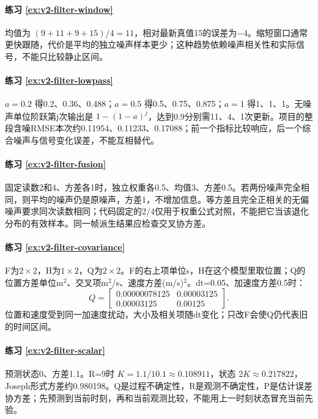 \paragraph*{练习 \ref{ex:v2-filter-window}}
\begin{solution}
均值为 $(9+11+9+15)/4=11$，相对最新真值15的误差为$-4$。缩短窗口通常更快跟随，代价是平均的独立噪声样本更少；这种趋势依赖噪声相关性和实际信号，不能只比较静止区间。
\end{solution}

\paragraph*{练习 \ref{ex:v2-filter-lowpass}}
\begin{solution}
$a=0.2$ 得0.2、0.36、0.488；$a=0.5$ 得0.5、0.75、0.875；$a=1$ 得1、1、1。无噪声单位阶跃第j次输出是 $1-(1-a)^j$，达到0.9分别需11、4、1次更新。项目的整段含噪RMSE本次约0.11954、0.11233、0.17088；前一个指标比较响应，后一个综合噪声与信号变化误差，不能互相替代。
\end{solution}

\paragraph*{练习 \ref{ex:v2-filter-fusion}}
\begin{solution}
固定读数2和4、方差各1时，独立权重各0.5、均值3、方差0.5。若两份噪声完全相同，则平均的噪声仍是原噪声，方差1，不增加信息。等方差且完全正相关的无偏噪声要求同次读数相同；代码固定的2/4仅用于权重公式对照，不能把它当该退化分布的有效样本。同一帧派生结果应检查交叉协方差。
\end{solution}

\paragraph*{练习 \ref{ex:v2-filter-covariance}}
\begin{solution}
F为$2\times2$，H为$1\times2$，Q为$2\times2$。F的右上项单位s，H在这个模型里取位置；Q的位置方差单位m$^2$、交叉项m$^2$/s、速度方差(m/s)$^2$。dt=0.05、加速度方差0.5时：
\[
Q=\begin{bmatrix}0.00000078125&0.00003125\\
0.00003125&0.00125\end{bmatrix}.
\]
位置和速度受到同一加速度扰动，大小及相关项随dt变化；只改F会使Q仍代表旧的时间区间。
\end{solution}

\paragraph*{练习 \ref{ex:v2-filter-scalar}}
\begin{solution}
预测状态0、方差1.1。R=9时 $K=1.1/10.1\approx0.108911$，状态 $2K\approx0.217822$，Joseph形式方差约0.980198。Q是过程不确定性，R是观测不确定性，P是估计误差协方差；先预测到当前时刻，再和当前观测比较，不能用上一时刻状态冒充当前先验。
\end{solution}

